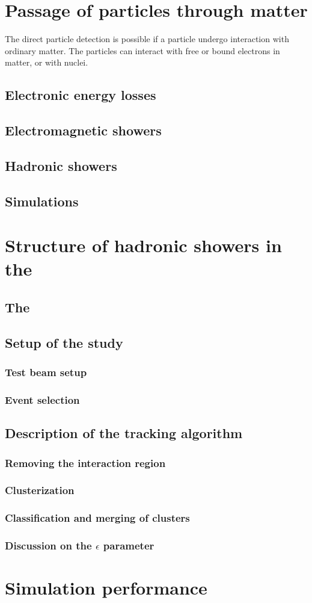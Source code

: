 \section{Passage of particles through matter}
The direct particle detection is possible if a particle undergo interaction with ordinary matter. %
The particles can interact with free or bound electrons in matter, or with nuclei. 

\subsection{Electronic energy losses}

\subsection{Electromagnetic showers}
\subsection{Hadronic showers}
\subsection{Simulations}

\section{Structure of hadronic showers in the \ecalp}
\subsection{The \ecalp}
\subsection{Setup of the study}
\subsubsection{Test beam setup}
\subsubsection{Event selection}
\subsection{Description of the tracking algorithm}
\subsubsection{Removing the interaction region}
\subsubsection{Clusterization}
\subsubsection{Classification and merging of clusters}
\subsubsection{Discussion on the $\epsilon$ parameter}

\section{Simulation performance}